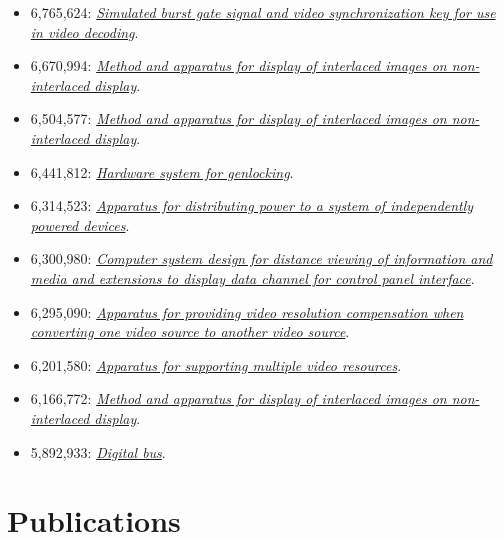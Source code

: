 \documentclass[10pt,letterpaper,oneside]{report}
\begin{document}
\begin{itemize}
  \item 6,765,624: \href{http://voltz.ws/resume/6765624.pdf}
    {\textit{Simulated burst gate signal and video synchronization key for use
    in video decoding}}.

  \item 6,670,994: \href{http://voltz.ws/resume/6670994.pdf}
    {\textit{Method and apparatus for display of interlaced images on
    non-interlaced display}}.

  \item 6,504,577: \href{http://voltz.ws/resume/6504577.pdf}
    {\textit{Method and apparatus for display of interlaced images on
    non-interlaced display}}.

  \item 6,441,812: \href{http://voltz.ws/resume/6441812.pdf}
    {\textit{Hardware system for genlocking}}.

  \item 6,314,523: \href{http://voltz.ws/resume/6314523.pdf}
    {\textit{Apparatus for distributing power to a system of independently
    powered devices}}.

  \item 6,300,980: \href{http://voltz.ws/resume/6300980.pdf}
    {\textit{Computer system design for distance viewing of information and
    media and extensions to display data channel for control panel interface}}.

  \item 6,295,090: \href{http://voltz.ws/resume/6295090.pdf}
    {\textit{Apparatus for providing video resolution compensation when
    converting one video source to another video source}}.

  \item 6,201,580: \href{http://voltz.ws/resume/6201580.pdf}
    {\textit{Apparatus for supporting multiple video resources}}.

  \item 6,166,772: \href{http://voltz.ws/resume/6166772.pdf}
    {\textit{Method and apparatus for display of interlaced images on
    non-interlaced display}}.

  \item 5,892,933: \href{http://voltz.ws/resume/5892933.pdf}
    {\textit{Digital bus}}.
\end{itemize}

\section{Publications}
\end{document}
